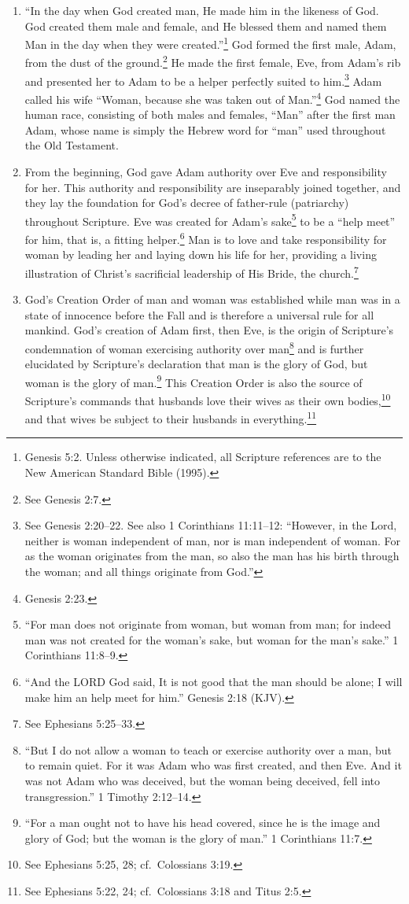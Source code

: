 \documentclass[
]{book}
\begin{document}
\begin{enumerate}
\def\labelenumi{\arabic{enumi}.}
\item
  ``In the day when God created man, He made him in the likeness of God. God created them male and female, and He blessed them and named them Man in the day when they were created.''\footnote{Genesis 5:2. Unless otherwise indicated, all Scripture references are to the New American Standard Bible (1995).} God formed the first male, Adam, from the dust of the ground.\footnote{See Genesis 2:7.} He made the first female, Eve, from Adam's rib and presented her to Adam to be a helper perfectly suited to him.\footnote{See Genesis 2:20--22. See also 1 Corinthians 11:11--12: ``However, in the Lord, neither is woman independent of man, nor is man independent of woman. For as the woman originates from the man, so also the man has his birth through the woman; and all things originate from God.''} Adam called his wife ``Woman, because she was taken out of Man.''\footnote{Genesis 2:23.} God named the human race, consisting of both males and females, ``Man'' after the first man Adam, whose name is simply the Hebrew word for ``man'' used throughout the Old Testament.
\item
  From the beginning, God gave Adam authority over Eve and responsibility for her. This authority and responsibility are inseparably joined together, and they lay the foundation for God's decree of father-rule (patriarchy) throughout Scripture. Eve was created for Adam's sake\footnote{``For man does not originate from woman, but woman from man; for indeed man was not created for the woman's sake, but woman for the man's sake.'' 1 Corinthians 11:8--9.} to be a ``help meet'' for him, that is, a fitting helper.\footnote{``And the LORD God said, It is not good that the man should be alone; I will make him an help meet for him.'' Genesis 2:18 (KJV).} Man is to love and take responsibility for woman by leading her and laying down his life for her, providing a living illustration of Christ's sacrificial leadership of His Bride, the church.\footnote{See Ephesians 5:25--33.}
\item
  God's Creation Order of man and woman was established while man was in a state of innocence before the Fall and is therefore a universal rule for all mankind. God's creation of Adam first, then Eve, is the origin of Scripture's condemnation of woman exercising authority over man\footnote{``But I do not allow a woman to teach or exercise authority over a man, but to remain quiet. For it was Adam who was first created, and then Eve. And it was not Adam who was deceived, but the woman being deceived, fell into transgression.'' 1 Timothy 2:12--14.} and is further elucidated by Scripture's declaration that man is the glory of God, but woman is the glory of man.\footnote{``For a man ought not to have his head covered, since he is the image and glory of God; but the woman is the glory of man.'' 1 Corinthians 11:7.} This Creation Order is also the source of Scripture's commands that husbands love their wives as their own bodies,\footnote{See Ephesians 5:25, 28; cf.~Colossians 3:19.} and that wives be subject to their husbands in everything.\footnote{See Ephesians 5:22, 24; cf.~Colossians 3:18 and Titus 2:5.}

\end{enumerate}
\end{document}
